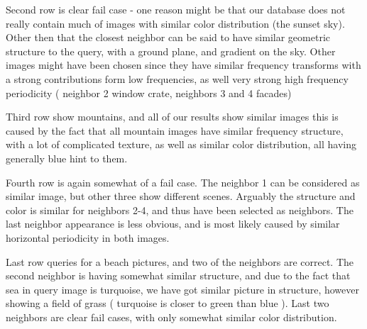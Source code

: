 \documentclass{report}
\begin{document}
Second row is clear fail case - one reason might be that our database does not really contain much of images with similar color distribution (the sunset sky). Other then that the closest neighbor can be said to have similar geometric structure to the query, with a ground plane, and gradient on the sky. Other images might have been chosen since they have similar frequency transforms with a strong contributions form low frequencies, as well very strong high frequency periodicity ( neighbor 2 window crate, neighbors 3 and 4 facades)

Third row show mountains, and all of our results show similar images this is caused by the fact that all mountain images have similar frequency structure, with a lot of complicated texture, as well as similar color distribution, all having generally blue hint to them.

Fourth row is again somewhat of a fail case. The neighbor 1 can be considered as similar image, but other three show different scenes. Arguably the structure and color is similar for neighbors 2-4, and thus have been selected as neighbors. The last neighbor appearance is less obvious, and is most likely caused by similar horizontal periodicity in both images.

Last row queries for a beach pictures, and two of the neighbors are correct. The second neighbor is having somewhat similar structure, and due to the fact that sea in query image is turquoise, we have got similar picture in structure, however showing a field of grass ( turquoise is closer to green than blue ). Last two neighbors are clear fail cases, with only somewhat similar color distribution.
\end{document}

